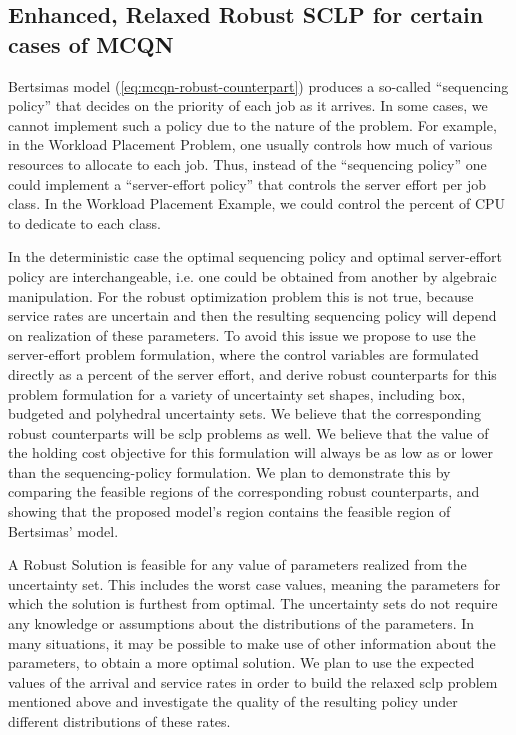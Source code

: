 \documentclass[11pt,a4paper,titlepage]{article}
\theoremstyle{definition}
\theoremstyle{plain}
\begin{document}
    \subsection{Enhanced, Relaxed Robust SCLP for certain cases of MCQN}
    \label{subsec:topics:enhanced-robust-sclp}


    Bertsimas model (\ref{eq:mcqn-robust-counterpart})
    produces a so-called  ``sequencing policy'' that decides on the priority of each job as it arrives.
    In some cases,
    we cannot implement such a policy due to the nature of the problem.
    For example,
    in the Workload Placement Problem,
    one usually controls how much of various resources to allocate to
    each job.
    Thus,
    instead of the ``sequencing policy'' one could implement a ``server-effort policy'' that controls the server effort per job class.
    In the Workload Placement Example,
    we could control the percent of CPU to dedicate to each class.

    In the deterministic case the optimal sequencing policy and optimal server-effort policy are interchangeable,
    i.e. one could be obtained from another by algebraic manipulation.
    For the robust optimization problem this is not true,
    because service rates are uncertain and then the resulting sequencing policy will depend on realization of these parameters.
    To avoid this issue we propose to use the server-effort problem formulation,
    where the control variables are formulated directly as a percent of the server effort,
    and derive robust counterparts for this problem formulation for a variety of uncertainty set shapes,
    including  box, budgeted and polyhedral uncertainty sets.
    We believe that the corresponding robust counterparts will be \gls{sclp} problems as well.
    We believe that the value of the holding cost objective for this formulation will always be as low as or lower than the sequencing-policy formulation.
    We plan to demonstrate this by comparing the feasible regions of the corresponding robust counterparts,
    and showing that the proposed model's region contains the feasible region of Bertsimas' model.

    A Robust Solution is feasible for any value of parameters realized from the uncertainty set.
    This includes the worst case values,
    meaning the parameters for which the solution is furthest from optimal.
    The uncertainty sets do not require any knowledge or assumptions about the distributions of the parameters.
    In many situations,
    it may be possible to make use of other information about the parameters,
    to obtain a more optimal solution.
    We plan to use the expected values of the arrival and service rates in order to build the relaxed \gls{sclp} problem mentioned above and investigate the quality of the resulting policy under different distributions of these rates.
\end{document}
